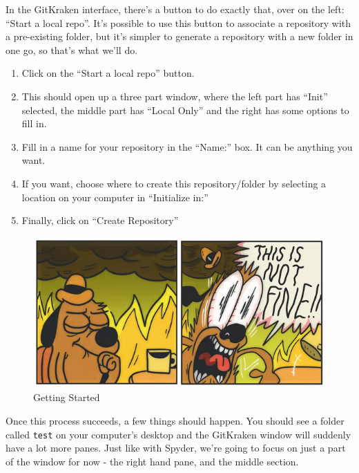 \documentclass[]{Nemilov}
\providecommand{\tightlist}{%
  \setlength{\itemsep}{0pt}\setlength{\parskip}{0pt}}
\begin{document}
In the GitKraken interface, there's a button to do exactly that, over on the
left: ``Start a local repo''. It's possible to use this button to associate a
repository with a pre-existing folder, but it's simpler to generate a repository
with a new folder in one go, so that's what we'll do.

\begin{enumerate}
\def\labelenumi{\arabic{enumi}.}
\tightlist
\item
  Click on the ``Start a local repo'' button.
\item
  This should open up a three part window, where the left part has
  ``Init'' selected, the middle part has ``Local Only'' and the right has some options
  to fill in.
\item
  Fill in a name for your repository in the ``Name:'' box. It can be anything you want.
\item
  If you want, choose where to create this repository/folder by selecting a
  location on your computer in ``Initialize in:''
\item
  Finally, click on ``Create Repository''
\end{enumerate}

\begin{figure}
\centering
\includegraphics{figures/FIXME.png}
\caption{\label{fig:py-version-control-getting-started}Getting Started}
\end{figure}

Once this process succeeds, a few things should happen. You should see a folder
called \texttt{test} on your computer's desktop and the GitKraken window will suddenly
have a lot more panes. Just like with Spyder, we're going to focus on just
a part of the window for now - the right hand pane, and the middle section.
\end{document}
